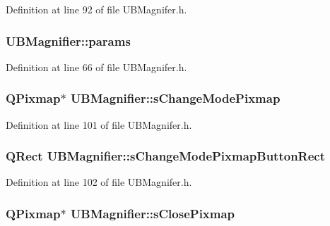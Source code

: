 Definition at line 92 of file U\-B\-Magnifer.\-h.

\hypertarget{class_u_b_magnifier_a6f32761f0d49639be70522952a36b671}{
\subsubsection[{params}]{ U\-B\-Magnifier\-::params}}\label{d4/d9d/class_u_b_magnifier_a6f32761f0d49639be70522952a36b671}


Definition at line 66 of file U\-B\-Magnifer.\-h.

\hypertarget{class_u_b_magnifier_aaef564708a8f9091c4c1e3eb6f7acb2a}{
\subsubsection[{s\-Change\-Mode\-Pixmap}]{\setlength{\rightskip}{0pt plus 5cm}Q\-Pixmap$\ast$ U\-B\-Magnifier\-::s\-Change\-Mode\-Pixmap\hspace{0.3cm}{\ttfamily [protected]}}}\label{d4/d9d/class_u_b_magnifier_aaef564708a8f9091c4c1e3eb6f7acb2a}


Definition at line 101 of file U\-B\-Magnifer.\-h.

\hypertarget{class_u_b_magnifier_ac3924431e6d2a21f1fad8762730606bc}{
\subsubsection[{s\-Change\-Mode\-Pixmap\-Button\-Rect}]{\setlength{\rightskip}{0pt plus 5cm}Q\-Rect U\-B\-Magnifier\-::s\-Change\-Mode\-Pixmap\-Button\-Rect\hspace{0.3cm}{\ttfamily [protected]}}}\label{d4/d9d/class_u_b_magnifier_ac3924431e6d2a21f1fad8762730606bc}


Definition at line 102 of file U\-B\-Magnifer.\-h.

\hypertarget{class_u_b_magnifier_a204f74b39d6e747041e511723c68dcfe}{
\subsubsection[{s\-Close\-Pixmap}]{\setlength{\rightskip}{0pt plus 5cm}Q\-Pixmap$\ast$ U\-B\-Magnifier\-::s\-Close\-Pixmap\hspace{0.3cm}{\ttfamily [protected]}}}\label{d4/d9d/class_u_b_magnifier_a204f74b39d6e747041e511723c68dcfe}


